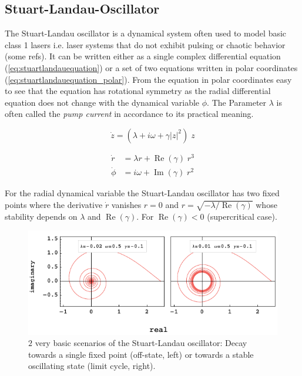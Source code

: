 	
	

\subsection{Stuart-Landau-Oscillator}
	The Stuart-Landau oscillator is a dynamical system often used to model basic class 1 lasers i.e. laser systems that do not exhibit pulsing or chaotic behavior (some refs). It can be written either as a single complex differential equation (\ref{eq:stuartlandauequation}) or a set of two equations written in polar coordinates (\ref{eq:stuartlandauequation_polar}). From the equation in polar coordinates easy to see that the equation has rotational symmetry as the radial differential equation does not change with the dynamical variable $\phi$. The Parameter $\lambda$ is often called the \emph{pump current} in accordance to its practical meaning. 

\begin{equation}	
	\dot{z} = (\lambda +  i \omega + \gamma |z|^2 ) \; z
	\label{eq:stuartlandauequation}		
\end{equation}

\begin{equation}
	\begin{split}
	\dot{r} & = \lambda r + \operatorname{Re} (\gamma) \; r^{3} \\
	\dot{\phi} &= i \omega + \operatorname{Im}(\gamma) \; r^{2} 
	\end{split}
	\label{eq:stuartlandauequation_polar}
\end{equation}

	For the radial dynamical variable the Stuart-Landau oscillator has two fixed points where the derivative $\dot{r}$ vanishes $r = 0$ and $r = \sqrt{-\lambda /\operatorname{Re}(\gamma)}$ whose stability depends on $\lambda$ and $\operatorname{Re}(\gamma)$. For $\operatorname{Re}(\gamma) < 0 $ (supercritical case).


\begin{figure}
	\centering
	\includegraphics[width=0.99\linewidth]{pics/stuart_landau_complex_Focus_LC}
	\caption{$2$ very basic scenarios of the Stuart-Landau oscillator: Decay towards a single fixed point (off-state, left) or towards a stable oscillating state (limit cycle, right).}
	\label{fig:stuart_spiral}
\end{figure}


